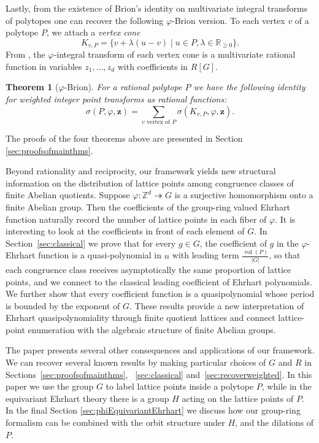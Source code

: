 \documentclass[12pt,reqno]{amsart}
\newtheorem{thm}{Theorem}[section]
\theoremstyle{definition}
\theoremstyle{remark}
\DeclareMathOperator{\vol}{vol}
\newcommand{\R}{\mathbb{R}}
\renewcommand{\phi}{\varphi}
\begin{document}
Lastly, from the existence of Brion's identity on multivariate integral transforms of polytopes one can recover the following $\phi$-Brion version.
To each vertex $v$ of a polytope $P$, we attach a {\textit{vertex cone}}     \[K_{v,P} = \{v + \lambda(u-v) \mid u \in P, \lambda \in \R_{\geq 0}\}.\]
From , the $\phi$-integral transform of each vertex cone is a multivariate rational function in variables $z_1,\dots, z_d$ with coefficients in $R[G]$.

\begin{thm}[$\varphi$-Brion]\label{thm:phi-Brion}
For a rational polytope $P$ we have the following identity for weighted integer point transforms as  rational functions:
\[
\sigma(P,\varphi,\mathbf{z}) =  \sum_{v \text{ vertex of }P} \sigma(K_{v,P}, \varphi, \mathbf{z}).
\]
\end{thm}


The proofs of the four theorems above are presented in Section \ref{sec:proofsofmainthms}.  

Beyond rationality and reciprocity, our framework yields new structural information on the distribution of lattice points among congruence classes of finite Abelian quotients. Suppose $\varphi:\mathbb Z^d \twoheadrightarrow G$ is a surjective homomorphism onto a finite Abelian group. Then the coefficients of the group-ring valued Ehrhart function naturally record the number of lattice points in each fiber of $\varphi$. It is interesting to look at the coefficients in front of each element of $G$. In Section~\ref{sec:classical} we prove that for every $g\in G$, the coefficient of $g$ in the $\varphi$-Ehrhart function is a quasi-polynomial in $n$ with leading term $\tfrac{\vol(P)}{|G|}$,
so that each congruence class receives asymptotically the same proportion of lattice points, and we connect to the classical leading coefficient of Ehrhart polynomials. We further show that every coefficient function is a quasipolynomial whose period is bounded by the exponent of $G$. These results provide a new interpretation of Ehrhart quasipolynomiality through finite quotient lattices and connect lattice-point enumeration with the algebraic structure of finite Abelian groups.

The paper presents several other consequences and applications of our framework. We can recover several known results by making particular choices 
of $G$ and $R$ in Sections~\ref{sec:proofsofmainthms}, ~\ref{sec:classical} and~\ref{sec:recoverweighted}. In this paper we use the group $G$ to label lattice points inside a polytope $P$, while in the equivariant Ehrhart theory \cite{StapledonEquivariant} there is a group $H$ acting on the lattice points of $P$. In the final Section \ref{sec:phiEquivariantEhrhart} we discuss how our group-ring formalism can be combined with the orbit structure under $H$, and the dilations of $P$.  
\end{document}
